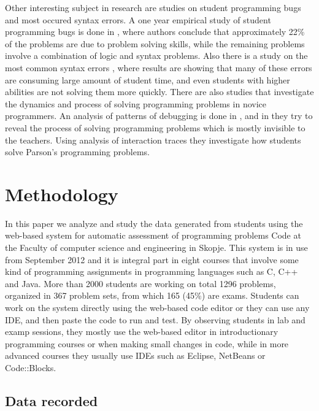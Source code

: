 \documentclass{llncs}
\begin{document}
Other interesting subject in research are studies on student programming bugs
and most occured syntax errors. A one year empirical
study of student programming bugs is done in \cite{bryce2010one}, where authors
conclude that approximately 22\% of the problems are due to problem solving
skills, while the remaining problems involve a combination of logic and syntax
problems. Also there is a study on the most common syntax errors
\cite{denny2012all}, where results are showing that many of these errors are
consuming large amount of student time, and even students with higher abilities
are not solving them more quickly. There are also studies that investigate
the dynamics and process of solving programming problems in novice programmers.
An analysis of patterns of debugging is done in \cite{ahmadzadeh2005analysis},
and in \cite{helminen2012students} they try to reveal the process of solving
programming problems which is mostly invisible to the teachers. Using analysis
of interaction traces they investigate how students solve Parson's
\cite{parsons2006parson} programming problems.

\section{Methodology}

In this paper we analyze and study the data generated from students using the
web-based system for automatic assessment of programming problems Code at the
Faculty of computer science and engineering in Skopje.
This system is in use from September 2012 and it is integral part in eight courses
that involve some kind of programming assignments in programming languages such
as C, C++ and Java. More than 2000 students are working on total 1296 problems,
organized in 367 problem sets, from which 165 (45\%) are exams. Students can
work on the system directly using the web-based code editor or they can use any
IDE, and then paste the code to run and test. By observing students in lab
and examp sessions, they mostly use the web-based editor in
introductionary programming courses or when making small changes in code, while
in more advanced courses they usually use IDEs such as Eclipse, NetBeans or
Code::Blocks.

\subsection{Data recorded}
\end{document}

